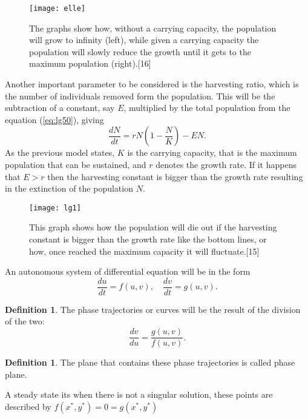 \documentclass[a4paper]{report}
\theoremstyle{definition}
\newtheorem{defn}[thm]{Definition}
\begin{document}
\begin{figure}[h]
\texttt{[image: elle]}

\caption{The graphs show how, without a carrying capacity, the population will grow to infinity (left), while given a carrying capacity the population will slowly reduce the growth until it gets to the maximum population (right).[16]}
\label{fig:lgfigure}
\end{figure} 

Another important parameter to be considered is the harvesting ratio, which is the number of individuals removed form the population. This will be the subtraction of a constant, say $E$, multiplied by the total population from the equation (\ref{eq:lg50}), giving
\begin{equation}
\frac{dN}{dt}=rN\left(1-\frac{N}{K}\right)-EN.
\end{equation}
As the previous model states, $K$ is the carrying capacity, that is the maximum population that can be sustained, and $r$ denotes the growth rate. If it happens that $E>r$ then the harvesting constant is bigger than the growth rate resulting in the extinction of the population $N$.

\begin{figure}[h]
\texttt{[image: lg1]}

\caption{This graph shows how the population will die out if the harvesting constant is bigger than the growth rate like the bottom lines, or how, once reached the maximum capacity it will fluctuate.[15]}
\label{fig:lgfigure1}
\end{figure}

An autonomous system of differential equation will be in the form
\begin{equation}
\frac{du}{dt}=f(u,v), \quad \frac{dv}{dt}=g(u,v).
\end{equation}
\begin{mdframed}[backgroundcolor=airforceblue!25] 
\begin{defn}
\label{lgdef1}
The phase trajectories or curves will be the result of the division of the two:
\begin{equation}
\frac{dv}{du}=\frac{g(u,v)}{f(u,v)}.
\end{equation}
\end{defn}
\end{mdframed}
\begin{mdframed}[backgroundcolor=airforceblue!25] 
\begin{defn}
\label{lgdef2}
The plane that contains these phase trajectories is called phase plane.
\end{defn}
\end{mdframed}
A steady state its when there is not a singular solution, these points are described by $f(x^*,y^*)=0=g(x^*,y^*)$
\end{document}
